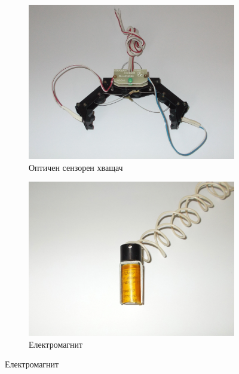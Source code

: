 \begin{figure}
    \centering
    \begin{subfigure}{0.7\textwidth}
        \centering
        \includegraphics[width=\linewidth]{pictures/robko_opto_claw.jpg}
        \caption{Оптичен сензорен хващач}
        \label{fig:robko_opto}
    \end{subfigure}
    \par\bigskip
    \begin{subfigure}{0.45\textwidth}
        \centering
        \includegraphics[width=\linewidth]{pictures/robko_electromagnet.jpg}
        \caption{Електромагнит}
        \label{fig:robko_em}
    \end{subfigure}
    \hfill%

\end{figure}
